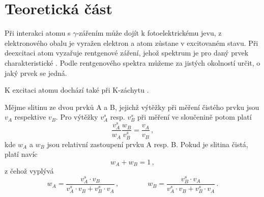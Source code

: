 \section*{Teoretická část}
Při interakci atomu s $\gamma$-zářením může dojít k fotoelektrickému jevu, z elektronového obalu je vyražen elektron a atom zůstane v excitovaném stavu. Při deexcitaci atom vyzařuje rentgenové záření, jehož spektrum je pro daný prvek charakteristické \cite{skripta}. Podle rentgenového spektra můžeme za jistých okolností určit, o jaký prvek se jedná.

K excitaci atomu dochází také při K-záchytu \cite{skripta}.

Mějme slitinu ze dvou prvků A a B, jejichž výtěžky při měření čistého prvku jsou $v_A$ respektive $v_B$. Pro výtěžky $v^s_A$ resp. $v^s_B$ při měření ve sloučenině potom platí
\begin{equation}
\frac{v_A^s}{w_A} \frac{w_B}{v_B^s} = \frac{v_A}{v_B} \,,
\end{equation}
kde $w_A$ a $w_B$ jsou relativní zastoupení prvku A resp. B. Pokud je slitina čistá, platí navíc
\begin{equation}
w_A+w_B=1 \,,
\end{equation}
z čehož vyplývá
\begin{equation} \label{e:konc}
w_A=\frac{v_A^s \cdot v_B}{v_A^s \cdot v_B + v_B^s\cdot v_A} \,, \qquad \qquad 
w_B=\frac{v_B^s \cdot v_A}{v_A^s \cdot v_B + v_B^s\cdot v_A} \,.
\end{equation}